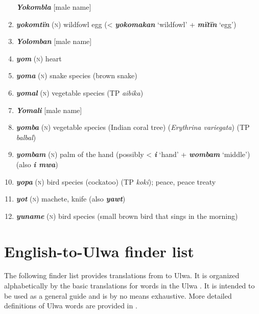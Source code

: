\begin{enumerate}[noitemsep, label={}, align=left, widest=190, labelsep=1ex,leftmargin=*,itemindent=-10pt]
\textbf{\textit{Yokombla}} [male name] \item 
\textbf{\textit{yokomtïn}} (\textsc{n}) wildfowl egg (< \textbf{\textit{yokomakan}} ‘wildfowl’ + \textbf{\textit{mïtïn}} ‘egg’) \item 
\textbf{\textit{Yolomban}} [male name] \item 
\textbf{\textit{yom}} (\textsc{n}) heart \item 
\textbf{\textit{yoma}} (\textsc{n}) snake species (brown snake) \item 
\textbf{\textit{yomal}} (\textsc{n}) vegetable species (TP \textit{aibika}) \item 
\textbf{\textit{Yomali}} [male name] \item 
\textbf{\textit{yomba}} (\textsc{n}) vegetable species (Indian coral tree) (\textit{Erythrina variegata}) (TP \textit{balbal}) \item 
\textbf{\textit{yombam}} (\textsc{n}) palm of the hand (possibly < \textbf{\textit{i}} ‘hand’ + \textbf{\textit{wombam}} ‘middle’) (also \linebreak \textbf{\textit{i mwa}}) \item 
\textbf{\textit{yopa}} (\textsc{n}) bird species (cockatoo) (TP \textit{koki}); peace, peace treaty \item 
\textbf{\textit{yot}} (\textsc{n}) machete, knife (also \textbf{\textit{yawt}}) \item 
\textbf{\textit{yuname}} (\textsc{n}) bird species (small brown bird that sings in the morning)
\end{enumerate}

\newpage

\section{English-to-Ulwa finder list}\label{sec:17.2}

The following finder list provides translations from  to Ulwa. It is organized alphabetically by the basic  translations for words in the Ulwa . It is intended to be used as a general guide and is by no means exhaustive. More detailed definitions of Ulwa words are provided in .\\


